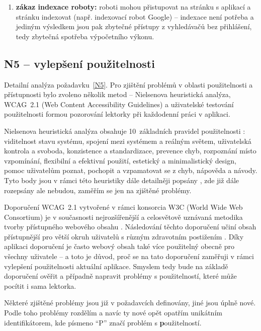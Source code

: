 \begin{enumerate}[label=\textbf{B\arabic*}]
    \item \label{B6} \textbf{zákaz indexace roboty:} roboti mohou přistupovat na stránku s aplikací a stránku indexovat (např. indexovací robot Google) -- indexace není potřeba a jediným výsledkem jsou pak zbytečné přístupy z vyhledávačů bez přihlášení, tedy zbytečná spotřeba výpočetního výkonu.
\end{enumerate}


\subsection{N5 -- vylepšení použitelnosti}\label{subsec:N5detail}

Detailní analýza požadavku~\ref{N5}.
Pro zjištění problémů v oblasti použitelnosti a přístupnosti bylo zvoleno několik metod -- Nielsenova heuristická analýza, WCAG~2.1 (Web Content Accessibility Guidelines) a uživatelské testování použitelnosti formou pozorování lektorky při každodenní práci v aplikaci. 

Nielsenova heuristická analýza obsahuje 10~základních pravidel použitelnosti \cite{nielson}: viditelnost stavu systému, spojení mezi systémem a reálným světem, uživatelská kontrola a svoboda, konzistence a standardizace, prevence chyb, rozpoznání místo vzpomínání, flexibilní a efektivní použití, estetický a minimalistický design, pomoc uživatelům poznat, pochopit a vzpamatovat se z chyb, nápověda a návody. Tyto body jsou v rámci této heuristiky dále detailněji popsány \cite{nielson}, zde již dále rozepsány ale nebudou, zaměřím se jen na zjištěné problémy.

Doporučení WCAG~2.1 vytvořené v rámci konsorcia W3C (World Wide Web Consortium) je v současnosti nejrozšířenější a celosvětově uznávaná metodika tvorby přístupného webového obsahu \cite{wcag-zdrojak}. Následování těchto doporučení učiní obsah přístupnější pro větší okruh uživatelů s různým zdravotním postižením \cite{wcag}. Díky aplikaci doporučení je často webový obsah také více použitelný obecně pro všechny uživatele \cite{wcag} -- a toto je důvod, proč se na tato doporučení zaměřuji v rámci vylepšení použitelnosti aktuální aplikace. Smyslem tedy bude na základě doporučení ověřit a případně napravit problémy s použitelností, které může pocítit i sama lektorka.

Některé zjištěné problémy jsou již v požadavcích definovány, jiné jsou úplně nové. Podle toho problémy rozdělím a navíc ty nové opět opatřím unikátním identifikátorem, kde písmeno \enquote{P} značí problém s \textbf{p}oužitelností.

